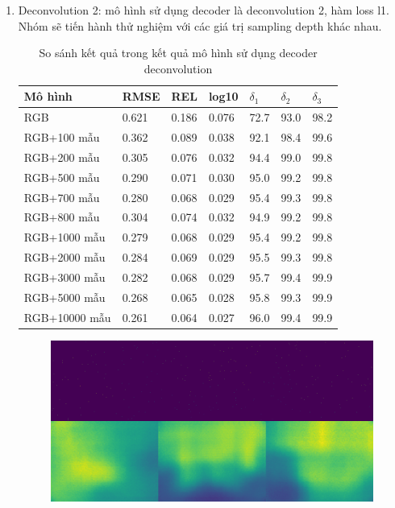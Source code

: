 \begin{enumerate}
\item Deconvolution 2: mô hình sử dụng decoder là  deconvolution 2, hàm loss l1. Nhóm sẽ tiến hành thử nghiệm với các giá trị sampling depth khác nhau. 
\begin{table}[H]
\centering
\begin{tabular}{ |p{3cm}|p{1.5cm}|p{1.5cm}|p{1cm}|p{1cm}|p{1cm}|p{1cm}|   }
\hline
Mô hình & RMSE &  REL & log10 & $\delta_1$ & $\delta_2$ & $\delta_3$ \\
\hline
RGB & 0.621 & 0.186 & 0.076 & 72.7 & 93.0 & 98.2 \\
\hline
RGB+100 mẫu & 0.362 &  0.089  & 0.038 & 92.1 & 98.4 & 99.6\\
\hline
RGB+200 mẫu & 0.305 & 0.076 & 0.032 & 94.4 & 99.0 & 99.8 \\
\hline
RGB+500 mẫu & 0.290 & 0.071 & 0.030 & 95.0 & 99.2 & 99.8\\
\hline
RGB+700 mẫu & 0.280 & 0.068 & 0.029 & 95.4 & 99.3 & 99.8\\
\hline
RGB+800 mẫu & 0.304 & 0.074 & 0.032 & 94.9 & 99.2 & 99.8\\
\hline
RGB+1000 mẫu & 0.279 & 0.068 & 0.029 & 95.4 & 99.2 & 99.8\\
\hline
RGB+2000 mẫu & 0.284 & 0.069 & 0.029 & 95.5 & 99.3 & 99.8\\
\hline 
RGB+3000 mẫu & 0.282 & 0.068 & 0.029 & 95.7 & 99.4 & 99.9\\
\hline
RGB+5000 mẫu & 0.268 & 0.065 & 0.028 & 95.8 & 99.3 & 99.9\\
\hline
RGB+10000 mẫu & 0.261 & 0.064 & 0.027 & 96.0 & 99.4 & 99.9\\
\hline
\end{tabular}
\caption{So sánh kết quả trong kết quả mô hình sử dụng decoder deconvolution}
\label{tab:deconv2}
\end{table}
 \begin{center}
   \begin{figure}[H]
   \begin{center}
   \includegraphics[scale=0.5]{image/100sample}

\end{center}
\end{figure}
\end{center}
\end{enumerate}
